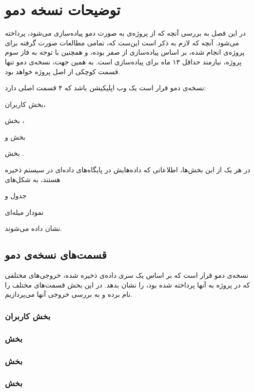 \documentclass[11pt, oneside]{book}
\begin{document}
\frontmatter

\tableofcontents
\mainmatter

\chapter{توضیحات نسخه دمو}
در این فصل به بررسی آنچه که از پروژه‌ی 
به صورت دمو پیاده‌سازی می‌شود، پرداخته می‌شود. آنچه که لازم به ذکر است این‌ست که، تمامی مطالعات صورت گرفته برای پروژه‌ی
انجام شده، بر اساس پیاده‌سازی از صفر بوده، و همچنین با توجه به فاز سوم پروژه، نیازمند حداقل ۱۳ ماه برای پیاده‌سازی است. به همین جهت، نسخه‌ی دمو تنها قسمت کوچکی از اصل پروژه خواهد بود.

نسخه‌ی دمو قرار است یک وب اپلیکیشن باشد که ۴ قسمت اصلی دارد: 
\begin{enumerate*}
\item 
بخش کاربران،
\item 
بخش 
،
\item 
بخش 
و
\item
بخش 
. 
\end{enumerate*}
در هر یک از این بخش‌ها، اطلاعاتی که داده‌هایش در پایگاه‌های داده‌ای در سیستم ذخیره‌ هستند، به شکل‌های 
\begin{enumerate*}
\item 
جدول و
\item 
نمودار میله‌ای
\end{enumerate*}
نشان داده می‌شوند.
\section{قسمت‌های نسخه‌ی دمو}
نسخه‌ی دمو قرار است که بر اساس یک سری داده‌ی ذخیره شده، خروجی‌های مختلفی که در پروژه به آنها پرداخته شده بود، را نشان بدهد. در این بخش قسمت‌های مختلف را نام برده و به بررسی خروجی آنها می‌پردازیم.

\subsection{بخش کاربران}\label{ssec:users}

\subsection{بخش }\label{ssec:stock}

\subsection{بخش }\label{ssec:site}

\subsection{بخش }\label{ssec:shipment}
\end{document}
